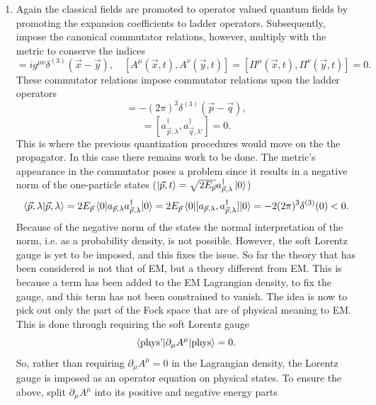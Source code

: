 \begin{enumerate}
	\item Again the classical fields are promoted to operator valued quantum fields by promoting the expansion coefficients to ladder operators. Subsequently, impose the canonical commutator relations, however, multiply with the metric to conserve the indices
	\begin{equation}
		[A^\mu(\vec{x},t), \Pi^\nu(\vec{y},t)]=ig^{\mu\nu}\delta^{(3)}(\vec{x}-\vec{y}), \quad [A^\mu(\vec{x},t),A^\nu(\vec{y},t)]=[\Pi^\mu(\vec{x},t),\Pi^\nu(\vec{y},t)]=0.
	\end{equation} 
	These commutator relations impose commutator relations upon the ladder operators
	\begin{equation}
		[a_{\vec{p},\lambda},a_{\vec{q},\lambda'}^\dagger]=-(2\pi)^3\delta^{(3)}(\vec{p}-\vec{q}),
	\end{equation} 
	\begin{equation}
		[a_{\vec{p},\lambda},a_{\vec{q},\lambda'}]=[a_{\vec{p},\lambda}^\dagger,a_{\vec{q},\lambda'}^\dagger]=0.
	\end{equation} 
	This is where the previous quantization procedures would move on the the propagator. In this case there remains work to be done. The metric's appearance in the commutator poses a problem since it results in a negative norm of the one-particle states ($\ket{\vec{p},t}=\sqrt{2E_{\vec{p}}}a_{\vec{p},\lambda}^\dagger\ket{0}$)
	\begin{equation}
		\braket{\vec{p},\lambda|\vec{p},\lambda}=2E_{\vec{p}}\braket{0|a_{\vec{p},\lambda}a_{\vec{p},\lambda}^\dagger|0}=2E_{\vec{p}}\braket{0|[a_{\vec{p},\lambda},a_{\vec{p},\lambda}^\dagger]|0}=-2(2\pi)^3\delta^{(3)}(0)<0.
	\end{equation}  
	Because of the negative norm of the states the normal interpretation of the norm, i.e. as a probability density, is not possible. However, the soft Lorentz gauge is yet to be imposed, and this fixes the issue. So far the theory that has been considered is not that of EM, but a theory different from EM. This is because a term has been added to the EM Lagrangian density, to fix the gauge, and this term has not been constrained to vanish. The idea is now to pick out only the part of the Fock space that are of physical meaning to EM. This is done through requiring the soft Lorentz gauge
	\begin{equation}
		\braket{\text{phys'}|\partial_\mu A^\mu|\text{phys}}=0.
	\end{equation} 
	So, rather than requiring $\partial_\mu A^\mu=0$ in the Lagrangian density, the Lorentz gauge is imposed as an operator equation on physical states. To ensure the above, split $\partial_\mu A^\mu$ into its positive and negative energy parts

\end{enumerate}
